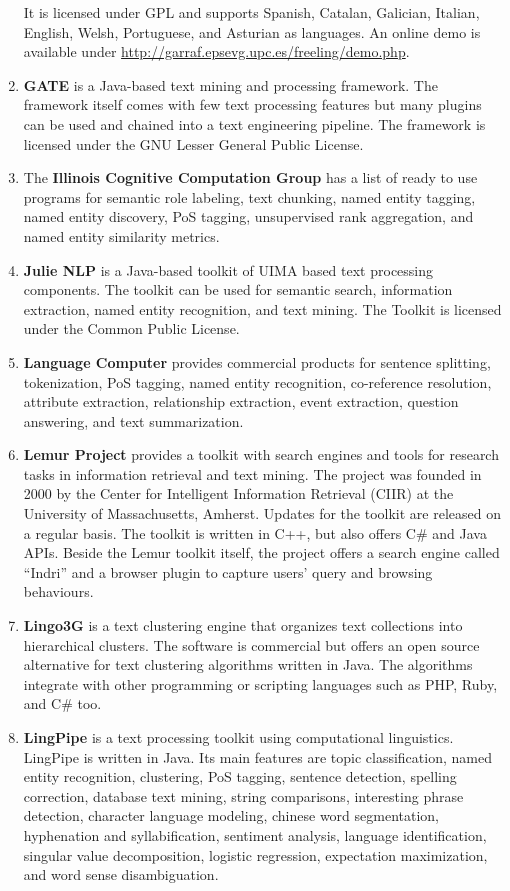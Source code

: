 \documentclass[a4paper,twoside]{book}      %
\begin{document}
\begin{enumerate}
It is licensed under GPL and supports Spanish, Catalan, Galician, Italian, English, Welsh, Portuguese, and Asturian as languages. An online demo is available under \url{http://garraf.epsevg.upc.es/freeling/demo.php}.
\item \textbf{GATE} \cite{cunningham2002gate} is a Java-based text mining and processing framework. The framework itself comes with few text processing features but many plugins can be used and chained into a text engineering pipeline.
The framework is licensed under the GNU Lesser General Public License.
\item The \textbf{Illinois Cognitive Computation Group} \cite{illinoisccg} has a list of ready to use programs for semantic role labeling, text chunking, named entity tagging, named entity discovery, PoS tagging, unsupervised rank aggregation, and named entity similarity metrics.
\item \textbf{Julie NLP} \cite{tomanek2007uima,hahn2008overview} is a Java-based toolkit of UIMA based text processing components. The toolkit can be used for semantic search, information extraction, named entity recognition, and text mining.
The Toolkit is licensed under the Common Public License.
\item \textbf{Language Computer} \cite{lanuagecomputer} provides commercial products for sentence splitting, tokenization, PoS tagging, named entity recognition, co-reference resolution, attribute extraction, relationship extraction, event extraction, question answering, and text summarization.
\item \textbf{Lemur Project} \cite{lemur} provides a toolkit with search engines and tools for research tasks in information retrieval and text mining. The project was founded in 2000 by the Center for Intelligent Information Retrieval (CIIR) at the University of Massachusetts, Amherst. Updates for the toolkit are released on a regular basis. The toolkit is written in C++, but also offers C\# and Java APIs. Beside the Lemur toolkit itself, the project offers a search engine called ``Indri'' and a browser plugin to capture users' query and browsing behaviours.
\item \textbf{Lingo3G} \cite{lingo3g} is a text clustering engine that organizes text collections into hierarchical clusters.
The software is commercial but \cite{stefanowski2003carrot} offers an open source alternative for text clustering algorithms written in Java. The algorithms integrate with other programming or scripting languages such as PHP, Ruby, and C\# too.
\item \textbf{LingPipe} \cite{lingpipe} is a text processing toolkit using computational linguistics. LingPipe is written in Java. Its main features are topic classification, named entity recognition, clustering, PoS tagging, sentence detection, spelling correction, database text mining, string comparisons, interesting phrase detection, character language modeling, chinese word segmentation, hyphenation and syllabification, sentiment analysis, language identification, singular value decomposition, logistic regression, expectation maximization, and word sense disambiguation.

\end{enumerate}
\end{document}
